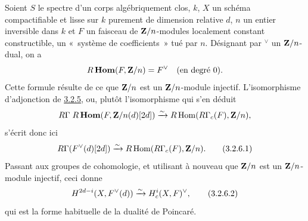\documentclass[10pt]{../fichiers-configuration-latex/smfart}
\begin{document}
\setcounter{subsubsection}{5}
\subsubsection{}
Soient $S$ le spectre d'un corps algébriquement clos, $k$, $X$ un
schéma compactifiable et lisse sur $k$ purement de dimension relative
$d$, $n$ un entier inversible dans $k$ et $F$ un faisceau de
$\mathbf{Z}/n$-modules localement constant constructible, \ie un « système de coefficients »  tué par $n$. Désignant par
${}^\vee$ un $\mathbf{Z}/n$-dual, on a
$$
R\operatorname{\mathbf{Hom}}(F,\mathbf{Z}/n)=F^{\vee}\quad\text{\rm (en degré 0)}{}.
$$
Cette formule résulte de ce que $\mathbf{Z}/n$ est un
$\mathbf{Z}/n$-module injectif.
L'isomorphisme d'adjonction de \hyperref[XVIII.thm3.2.5]{3.2.5}, ou, plutôt
l'isomorphisme qui s'en déduit
$$
R\Gamma\;R\operatorname{\mathbf{Hom}}(F,\mathbf{Z}/n(d)[2d])\xrightarrow{\sim}
R\operatorname{Hom}(R\Gamma_{c}(F),\mathbf{Z}/n){},
$$
s'écrit donc ici
\begin{equation*}
R\Gamma (F^{\vee}(d)[2d])\xrightarrow{\sim} R\operatorname{Hom}
(R\Gamma_{c}(F),\mathbf{Z}/n){}.\tag{3.2.6.1}
\end{equation*}%
Passant aux groupes de cohomologie, et utilisant à nouveau que
$\mathbf{Z}/n$ est un $\mathbf{Z}/n$-module injectif, ceci donne
\begin{equation*}
H^{2d-i}(X,F^{\vee}(d))\xrightarrow{\sim}H^{i}_{c}(X,F)^{\vee}{},\tag{3.2.6.2}
\end{equation*}%
qui est la forme habituelle de la dualité de Poincaré.
\end{document}
